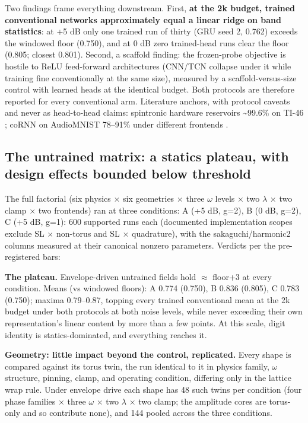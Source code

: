 \documentclass[10pt]{article}
\newcounter{none} %
\begin{document}
Two findings frame everything downstream. First, \textbf{at the 2k
budget, trained conventional networks approximately equal a linear ridge
on band statistics}: at +5 dB only one trained run of thirty (GRU seed
2, 0.762) exceeds the windowed floor (0.750), and at 0 dB zero
trained-head runs clear the floor (0.805; closest 0.801). Second, a
scaffold finding: the frozen-probe objective is hostile to ReLU
feed-forward architectures (CNN/TCN collapse under it while training
fine conventionally at the same size), measured by a
scaffold-versus-size control with learned heads at the identical budget.
Both protocols are therefore reported for every conventional arm.
Literature anchors, with protocol caveats and never as head-to-head
claims: spintronic hardware reservoirs \textasciitilde99.6\% on TI-46
\citep{torrejon2017}; coRNN on AudioMNIST 78--91\% under different
frontends \citep{rusch2021}.

\subsection{The untrained matrix: a statics plateau, with design effects
bounded below
threshold}\label{the-untrained-matrix-a-statics-plateau-with-design-effects-bounded-below-threshold}

The full factorial (six physics \ensuremath{\times} six geometries
\ensuremath{\times} three \ensuremath{\omega} levels \ensuremath{\times}
two \ensuremath{\lambda} \ensuremath{\times} two clamp
\ensuremath{\times} two frontends) ran at three conditions: A (+5 dB,
g=2), B (0 dB, g=2), C (+5 dB, g=1): 600 supported runs each (documented
implementation scopes exclude SL \ensuremath{\times} non-torus and SL
\ensuremath{\times} quadrature), with the sakaguchi/harmonic2 columns
measured at their canonical nonzero parameters. Verdicts per the
pre-registered bars:

\textbf{The plateau.} Envelope-driven untrained fields hold
\ensuremath{\approx} floor+3 at every condition. Means (vs windowed
floors): A 0.774 (0.750), B 0.836 (0.805), C 0.783 (0.750); maxima
0.79--0.87, topping every trained conventional mean at the 2k budget
under both protocols at both noise levels, while never exceeding their
own representation's linear content by more than a few points. At this
scale, digit identity is statics-dominated, and everything reaches it.

\textbf{Geometry: little impact beyond the control, replicated.} Every
shape is compared against its torus twin, the run identical to it in
physics family, \ensuremath{\omega} structure, pinning, clamp, and
operating condition, differing only in the lattice wrap rule. Under
envelope drive each shape has 48 such twins per condition (four phase
families \ensuremath{\times} three \ensuremath{\omega}
\ensuremath{\times} two \ensuremath{\lambda} \ensuremath{\times} two
clamp; the amplitude cores are torus-only and so contribute none), and
144 pooled across the three conditions.
\end{document}
